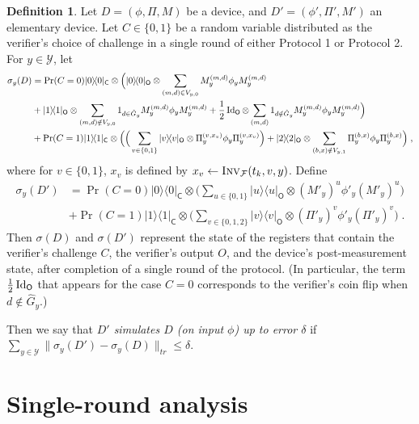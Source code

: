 \documentclass[11pt]{article}
\theoremstyle{remark}
\theoremstyle{definition}
\newtheorem{definition}[theorem]{Definition}
\newcommand{\ket}[1]{|#1\rangle}
\newcommand{\bra}[1]{\langle#1|}
\newcommand{\proj}[1]{\ket{#1}\!\bra{#1}}
\newcommand{\Id}{\ensuremath{\mathop{\rm Id}\nolimits}}
\newcommand{\reg}[1]{{\textsf{#1}}}
\newcommand{\mF}{\ensuremath{\mathcal{F}}}
\newcommand{\mY}{\ensuremath{\mathcal{Y}}}
\newcommand{\Inv}{\ensuremath{\textsc{Inv}}}
\newcommand{\dset}{G}
\begin{document}
\begin{definition}\label{def:device-dist}
Let $D = (\phi,\Pi,M)$ be a device, and $D'=(\phi',\Pi',M')$ an elementary device. 
Let $C\in\{0,1\}$ be a random variable distributed as the verifier's choice of challenge in a single round of either Protocol 1 or Protocol 2. For $y\in \mY$, let
\begin{align*}
\sigma_y(D) &=   \Pr(C=0) \proj{0}_\reg{C} \otimes\Big(  \proj{0}_\reg{O} \otimes  \sum_{(m,d) \in V_{y,0}}  M_y^{(m,d)} \phi_y M_y^{(m,d)}\\
& +   \proj{1}_\reg{O} \otimes  \sum_{(m,d) \notin V_{y,0}} 1_{d\in \hat{\dset}_y}  M_y^{(m,d)} \phi_y M_y^{(m,d)} + \frac{1}{2}\Id_{\reg{O}}\otimes  \sum_{(m,d)} 1_{d\notin \hat{\dset}_y}  M_y^{(m,d)} \phi_y M_y^{(m,d)} \Big)\\
&+\Pr(C=1)\proj{1}_\reg{C} \otimes \Big( \Big(\sum_{v\in\{0,1\}} \proj{v}_\reg{O} \otimes  \Pi_y^{(v,x_v)} \phi_y \Pi_y^{(v,x_v)} \Big)+ \proj{2}_\reg{O}\otimes \sum_{(b,x)\notin V_{y,1}}  \Pi_y^{(b,x)} \phi_y \Pi_y^{(b,x)}\Big)\;,
\end{align*}
where for $v\in\{0,1\}$, $x_v$ is defined by $x_v\leftarrow \Inv_\mF(t_k,v,y)$. Define 
\begin{align*}
\sigma_y(D') &= \Pr(C=0) \proj{0}_\reg{C} \otimes\big( \sum_{u\in \{0,1\}} \proj{u}_\reg{O}\otimes (M'_y)^{u} \phi'_y (M'_y)^{u}\Big)\\
&+\Pr(C=1)\proj{1}_\reg{C} \otimes \Big(\sum_{v\in\{0,1,2\}} \proj{v}_\reg{O} \otimes  (\Pi'_y)^{v} \phi'_y (\Pi'_y)^{v} \Big)\;.
\end{align*}
Then $\sigma(D)$ and $\sigma(D')$ represent the state of the registers that contain the verifier's challenge $C$, the verifier's output $O$, and the device's post-measurement state, after completion of a single round of the protocol. (In particular, the term $\frac{1}{2}\Id_{\reg{O}}$ that appears for the case $C=0$ corresponds to the verifier's coin flip when $d\notin \hat{\dset}_y$.)

Then we say that \emph{$D'$ simulates $D$ (on input $\phi$) up to error $\delta$} if $\sum_{y\in\mY}\|\sigma_y(D')-\sigma_y(D)\|_{tr} \leq \delta$. 
\end{definition}




\section{Single-round analysis}
\label{sec:soundness}
\end{document}
